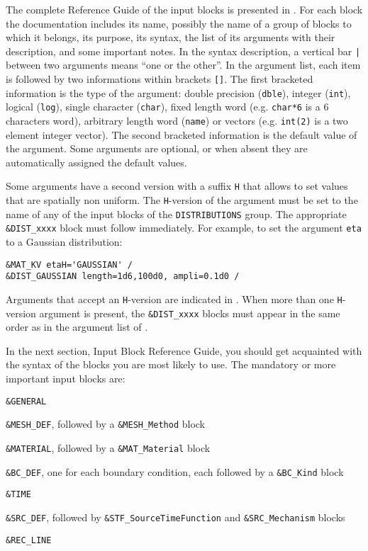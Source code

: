The complete Reference Guide of the input blocks is presented in .
For each block the documentation includes its name, 
possibly the name of a group of blocks to which it belongs,
its purpose, its syntax, the list of its arguments with their description, and some important notes.
In the syntax description, a vertical bar \texttt{|} between two arguments means ``one or the other''.
In the argument list, each item is followed by two informations within brackets \texttt{[]}.
The first bracketed information is the type of the argument: 
double precision (\texttt{dble}), integer (\texttt{int}),
logical (\texttt{log}), single character (\texttt{char}), 
fixed length word (e.g. \texttt{char*6} is a 6 characters word),
arbitrary length word (\texttt{name}) or vectors (e.g. \texttt{int(2)} is a two element integer vector).
The second bracketed information is the default value of the argument.
Some arguments are optional, or when absent they are automatically assigned the default values.

Some arguments have a second version with a suffix \texttt{H}
that allows to set values that are spatially non uniform.
The \texttt{H}-version of the argument must be set to the name of any of the input blocks
of the \texttt{DISTRIBUTIONS} group.
The appropriate \texttt{\&DIST\_xxxx} block must follow immediately.
For example, to set the argument \texttt{eta} to a Gaussian distribution:
\begin{verbatim}
&MAT_KV etaH='GAUSSIAN' /
&DIST_GAUSSIAN length=1d6,100d0, ampli=0.1d0 /
\end{verbatim}
Arguments that accept an \texttt{H}-version are indicated in .
When more than one \texttt{H}-version argument is present,
the \texttt{\&DIST\_xxxx} blocks must appear in the same order as in
the argument list of .

In the next section, Input Block Reference Guide,
you should get acquainted with the syntax of the blocks you are most likely to use.
The mandatory or more important input blocks are:

\begin{sitemize}
\item \texttt{\&GENERAL}
\item \texttt{\&MESH\_DEF}, followed by a \texttt{\&MESH\_Method} block
\item \texttt{\&MATERIAL}, followed by a \texttt{\&MAT\_Material} block
\item \texttt{\&BC\_DEF}, one for each boundary condition, each followed by a \texttt{\&BC\_Kind} block
\item \texttt{\&TIME}
\item \texttt{\&SRC\_DEF}, followed by \texttt{\&STF\_SourceTimeFunction} and \texttt{\&SRC\_Mechanism} blocks
\item \texttt{\&REC\_LINE}
\end{sitemize}

